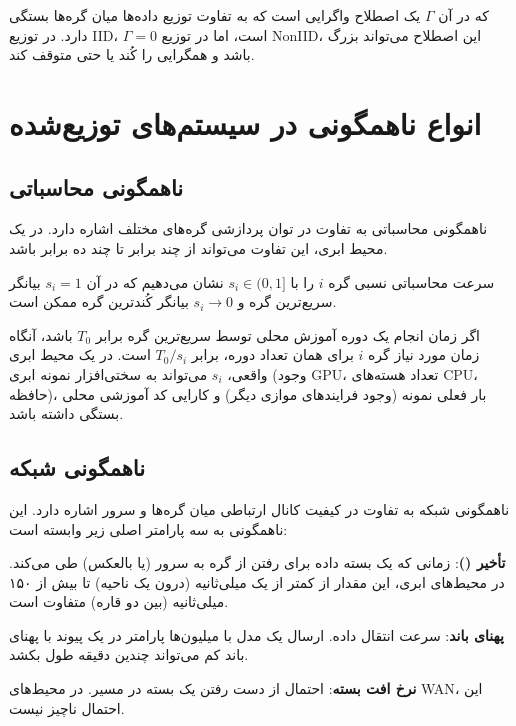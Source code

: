 که در آن $\Gamma$ یک اصطلاح واگرایی است که به تفاوت توزیع داده‌ها میان گره‌ها بستگی دارد. در توزیع \gls{IID}، $\Gamma = 0$ است، اما در توزیع \gls{NonIID}، این اصطلاح می‌تواند بزرگ باشد و همگرایی را کُند یا حتی متوقف کند.


\section{انواع ناهمگونی در سیستم‌های توزیع‌شده}
\label{sec:hetero_types}

\subsection{ناهمگونی محاسباتی}

ناهمگونی محاسباتی به تفاوت در توان پردازشی گره‌های مختلف اشاره دارد. در یک محیط ابری، این تفاوت می‌تواند از چند برابر تا چند ده برابر باشد.

\begin{ntdefinition}
سرعت محاسباتی نسبی گره $i$ را با $s_i \in (0, 1]$ نشان می‌دهیم که در آن $s_i = 1$ بیانگر سریع‌ترین گره و $s_i \to 0$ بیانگر کُندترین گره ممکن است.
\end{ntdefinition}

اگر زمان انجام یک دوره آموزش محلی توسط سریع‌ترین گره برابر $T_0$ باشد، آنگاه زمان مورد نیاز گره $i$ برای همان تعداد دوره، برابر $T_0 / s_i$ است. در یک محیط ابری واقعی، $s_i$ می‌تواند به سختی‌افزار نمونه ابری (وجود \gls{GPU}، تعداد هسته‌های \gls{CPU}، حافظه)، بار فعلی نمونه (وجود فرایندهای موازی دیگر) و کارایی کد آموزشی محلی بستگی داشته باشد.

\subsection{ناهمگونی شبکه}

ناهمگونی شبکه به تفاوت در کیفیت کانال ارتباطی میان گره‌ها و سرور اشاره دارد. این ناهمگونی به سه پارامتر اصلی زیر وابسته است:

\begin{itemize}
    \tick \textbf{تأخیر ()}: زمانی که یک بسته داده برای رفتن از گره به سرور (یا بالعکس) طی می‌کند. در محیط‌های ابری، این مقدار از کمتر از یک میلی‌ثانیه (درون یک ناحیه) تا بیش از ۱۵۰ میلی‌ثانیه (بین دو قاره) متفاوت است.
    
    \tick \textbf{پهنای باند}: سرعت انتقال داده. ارسال یک مدل با میلیون‌ها پارامتر در یک پیوند با پهنای باند کم می‌تواند چندین دقیقه طول بکشد.
    
    \tick \textbf{نرخ افت بسته}: احتمال از دست رفتن یک بسته در مسیر. در محیط‌های \gls{WAN}، این احتمال ناچیز نیست.
\end{itemize}

